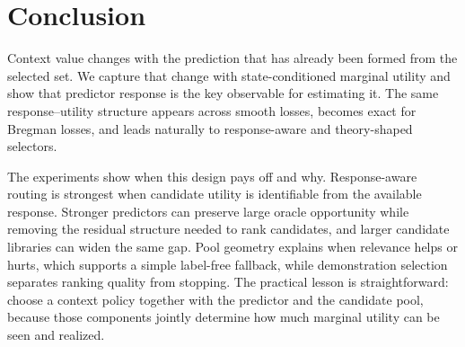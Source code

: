 \section{Conclusion}

Context value changes with the prediction that has already been formed from the
selected set. We capture that change with state-conditioned marginal utility
and show that predictor response is the key observable for estimating it. The
same response--utility structure appears across smooth losses, becomes exact for
Bregman losses, and leads naturally to response-aware and theory-shaped
selectors.

The experiments show when this design pays off and why. Response-aware routing
is strongest when candidate utility is identifiable from the available
response. Stronger predictors can preserve large oracle opportunity while
removing the residual structure needed to rank candidates, and larger candidate
libraries can widen the same gap. Pool geometry explains when relevance helps
or hurts, which supports a simple label-free fallback, while demonstration
selection separates ranking quality from stopping. The practical lesson is
straightforward: choose a context policy together with the predictor and the
candidate pool, because those components jointly determine how much marginal
utility can be seen and realized.
